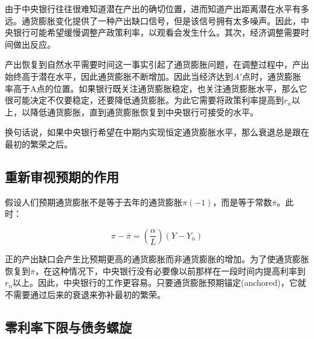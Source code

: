 \documentclass{article}
\begin{document}
由于中央银行往往很难知道潜在产出的确切位置，进而知道产出距离潜在水平有多远。通货膨胀变化提供了一种产出缺口信号，但是该信号拥有太多噪声。因此，中央银行可能希望缓慢调整产政策利率，以观看会发生什么。其次，经济调整需要时间做出反应。

产出恢复到自然水平需要时间这一事实引起了通货膨胀问题，在调整过程中，产出始终高于潜在水平，因此通货膨胀不断增加。因此当经济达到$ A' $点时，通货膨胀率高于A点的位置。如果银行既关注通货膨胀稳定，也关注通货膨胀水平，那么它很可能决定不仅要稳定，还要降低通货膨胀。为此它需要将政策利率提高到$ r_n $以上，以降低通货膨胀，直到通货膨胀恢复到中央银行可接受的水平。

换句话说，如果中央银行希望在中期内实现恒定通货膨胀水平，那么衰退总是跟在最初的繁荣之后。

\subsection{重新审视预期的作用}

假设人们预期通货膨胀不是等于去年的通货膨胀$ \pi(-1) $，而是等于常数$ \overline{\pi} $。此时：

\[
\pi-\overline{\pi}=(\frac{\alpha}{L})(Y-Y_n)
\]

正的产出缺口会产生比预期更高的通货膨胀而非通货膨胀的增加。为了使通货膨胀恢复到$ \overline{\pi} $，在这种情况下，中央银行没有必要像以前那样在一段时间内提高利率到$ r_n $以上。因此，中央银行的工作更容易。只要通货膨胀预期锚定(anchored)，它就不需要通过后来的衰退来弥补最初的繁荣。

\subsection{零利率下限与债务螺旋}
\end{document}
